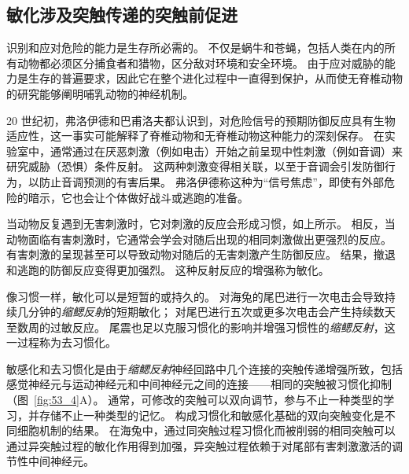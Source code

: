 \subsection{敏化涉及突触传递的突触前促进}

识别和应对危险的能力是生存所必需的。
不仅是蜗牛和苍蝇，包括人类在内的所有动物都必须区分捕食者和猎物，区分敌对环境和安全环境。
由于应对威胁的能力是生存的普遍要求，因此它在整个进化过程中一直得到保护，从而使无脊椎动物的研究能够阐明哺乳动物的神经机制。


20 世纪初，弗洛伊德和巴甫洛夫都认识到，对危险信号的预期防御反应具有生物适应性，这一事实可能解释了脊椎动物和无脊椎动物这种能力的深刻保存。
在实验室中，通常通过在厌恶刺激（例如电击）开始之前呈现中性刺激（例如音调）来研究威胁（恐惧）条件反射。
这两种刺激变得相关联，以至于音调会引发防御行为，以防止音调预测的有害后果。
弗洛伊德称这种为“信号焦虑”，即使有外部危险的暗示，它也会让个体做好战斗或逃跑的准备。


当动物反复遇到无害刺激时，它对刺激的反应会形成习惯，如上所示。
相反，当动物面临有害刺激时，它通常会学会对随后出现的相同刺激做出更强烈的反应。
有害刺激的呈现甚至可以导致动物对随后的无害刺激产生防御反应。
结果，撤退和逃跑的防御反应变得更加强烈。
这种反射反应的增强称为敏化。


像习惯一样，敏化可以是短暂的或持久的。
对海兔的尾巴进行一次电击会导致持续几分钟的\textit{缩鳃反射}的短期敏化；
对尾巴进行五次或更多次电击会产生持续数天至数周的过敏反应。
尾震也足以克服习惯化的影响并增强习惯性的\textit{缩鳃反射}，这一过程称为去习惯化。


敏感化和去习惯化是由于\textit{缩鳃反射}神经回路中几个连接的突触传递增强所致，包括感觉神经元与运动神经元和中间神经元之间的连接——相同的突触被习惯化抑制（图~\ref{fig:53_4}A）。
通常，可修改的突触可以双向调节，参与不止一种类型的学习，并存储不止一种类型的记忆。
构成习惯化和敏感化基础的双向突触变化是不同细胞机制的结果。
在海兔中，通过同突触过程习惯化而被削弱的相同突触可以通过异突触过程的敏化作用得到加强，异突触过程依赖于对尾部有害刺激激活的调节性中间神经元。


